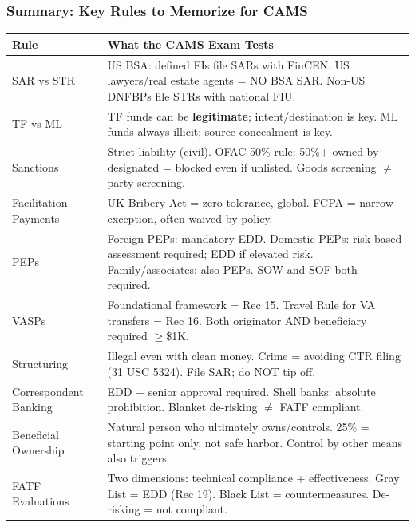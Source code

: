 \documentclass[12pt,aspectratio=169]{beamer}
\renewcommand{\scriptsize}{\fontsize{5}{6}\selectfont}
\newcommand{\keypoint}[1]{\textcolor{deepblue}{\textbf{#1}}}
\begin{document}
	\begin{frame}
		\frametitle{\fontsize{11}{13}\selectfont Summary: Key Rules to Memorize for CAMS}
		\scriptsize
		\begin{longtable}{|p{}|p{}|}
			\hline
			\keypoint{Rule} & \keypoint{What the CAMS Exam Tests} \\
			\hline
			SAR vs STR & US BSA: defined FIs file SARs with FinCEN. US lawyers/real estate agents = NO BSA SAR. Non-US DNFBPs file STRs with national FIU. \\
			\hline
			TF vs ML & TF funds can be \textbf{legitimate}; intent/destination is key. ML funds always illicit; source concealment is key. \\
			\hline
			Sanctions & Strict liability (civil). OFAC 50\% rule: 50\%+ owned by designated = blocked even if unlisted. Goods screening $\neq$ party screening. \\
			\hline
			Facilitation Payments & UK Bribery Act = zero tolerance, global. FCPA = narrow exception, often waived by policy. \\
			\hline
			PEPs & Foreign PEPs: mandatory EDD. Domestic PEPs: risk-based assessment required; EDD if elevated risk. Family/associates: also PEPs. SOW and SOF both required. \\
			\hline
			VASPs & Foundational framework = Rec 15. Travel Rule for VA transfers = Rec 16. Both originator AND beneficiary required $\geq$\$1K. \\
			\hline
			Structuring & Illegal even with clean money. Crime = avoiding CTR filing (31 USC 5324). File SAR; do NOT tip off. \\
			\hline
			Correspondent Banking & EDD + senior approval required. Shell banks: absolute prohibition. Blanket de-risking $\neq$ FATF compliant. \\
			\hline
			Beneficial Ownership & Natural person who ultimately owns/controls. 25\% = starting point only, not safe harbor. Control by other means also triggers. \\
			\hline
			FATF Evaluations & Two dimensions: technical compliance + effectiveness. Gray List = EDD (Rec 19). Black List = countermeasures. De-risking = not compliant. \\
			\hline
		\end{longtable}
	\end{frame}
	
\end{document}
